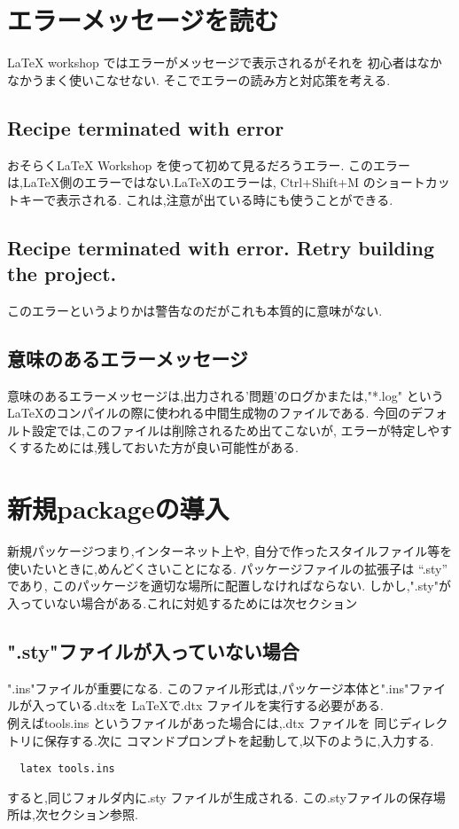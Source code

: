 \documentclass{ltjsarticle}
\begin{document}
\section{エラーメッセージを読む}
LaTeX workshop ではエラーがメッセージで表示されるがそれを
初心者はなかなかうまく使いこなせない.
そこでエラーの読み方と対応策を考える.
\subsection{Recipe terminated with error}
おそらくLaTeX Workshop を使って初めて見るだろうエラー.
このエラーは,LaTeX側のエラーではない.LaTeXのエラーは,
Ctrl+Shift+M のショートカットキーで表示される.
これは,注意が出ている時にも使うことができる.
\subsection{Recipe terminated with error. Retry building the project.}
このエラーというよりかは警告なのだがこれも本質的に意味がない.
\subsection{意味のあるエラーメッセージ}
意味のあるエラーメッセージは,出力される'問題'のログかまたは,"*.log"
というLaTeXのコンパイルの際に使われる中間生成物のファイルである.
今回のデフォルト設定では,このファイルは削除されるため出てこないが,
エラーが特定しやすくするためには,残しておいた方が良い可能性がある.

\section{新規packageの導入}
新規パッケージつまり,インターネット上や,
自分で作ったスタイルファイル等を使いたいときに,めんどくさいことになる.
パッケージファイルの拡張子は “.sty” であり,
このパッケージを適切な場所に配置しなければならない.
しかし,".sty"が入っていない場合がある.これに対処するためには次セクション
\subsection{".sty"ファイルが入っていない場合}
".ins"ファイルが重要になる.
このファイル形式は,パッケージ本体と".ins"ファイルが入っている.dtxを
LaTeXで.dtx ファイルを実行する必要がある.\\
例えばtools.ins というファイルがあった場合には,.dtx ファイルを
同じディレクトリに保存する.次に
コマンドプロンプトを起動して,以下のように,入力する.
\begin{verbatim}
  latex tools.ins
\end{verbatim}
すると,同じフォルダ内に.sty ファイルが生成される.
この.styファイルの保存場所は,次セクション参照.
\end{document}

